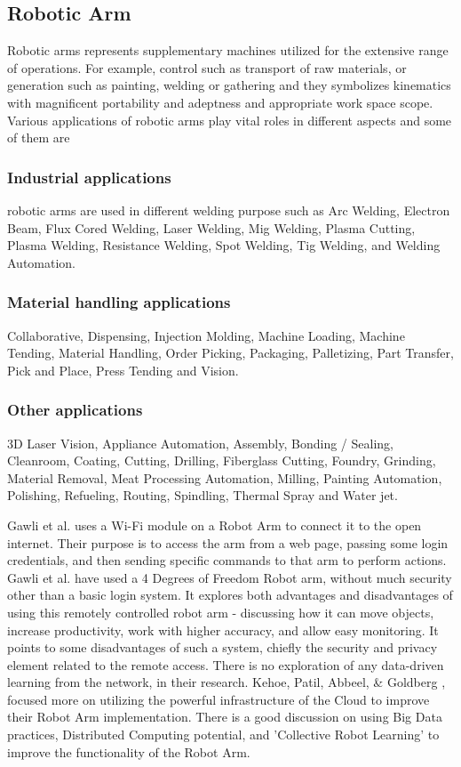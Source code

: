 \documentclass[conference]{IEEEtran}
\begin{document}
\subsection{Robotic Arm}
Robotic arms represents  supplementary machines utilized for the extensive range of operations. For example, control such as transport of raw materials, or  generation such as painting, welding or gathering and they symbolizes kinematics with magnificent portability and adeptness and appropriate work space scope. Various applications of robotic arms \cite{twelve} play vital roles in different aspects and some of them are

\subsubsection{Industrial applications}
robotic arms are used in different welding purpose such as Arc Welding, Electron Beam, Flux Cored Welding, Laser Welding, Mig Welding, Plasma Cutting, Plasma Welding, Resistance Welding, Spot Welding, Tig Welding, and Welding Automation.


\subsubsection{Material handling applications}
Collaborative, Dispensing, Injection Molding, Machine Loading, Machine Tending, Material Handling, Order Picking, Packaging, Palletizing, Part Transfer, Pick and Place, Press Tending and Vision.

\subsubsection{Other applications}
3D Laser Vision, Appliance Automation, Assembly, Bonding / Sealing, Cleanroom, Coating, Cutting, Drilling, Fiberglass Cutting, Foundry, Grinding, Material Removal, Meat Processing Automation, Milling, Painting Automation, Polishing, Refueling, Routing, Spindling, Thermal Spray and Water jet.

Gawli et al. \cite{thirteen} uses a Wi-Fi module on a Robot Arm to connect it to the open internet. Their purpose is to access the arm from a web page, passing some login credentials, and then sending specific commands to that arm to perform actions. Gawli et al. have used a 4 Degrees of Freedom Robot arm, without much security other than a basic login system. It explores both advantages and disadvantages of using this remotely controlled robot arm - discussing how it can move objects, increase productivity, work with higher accuracy, and allow easy monitoring. It points to some disadvantages of such a system, chiefly the security and privacy element related to the remote access. There is no exploration of any data-driven learning from the network, in their research. Kehoe, Patil, Abbeel, \& Goldberg \cite{fourteen}, focused more on utilizing the powerful infrastructure of the Cloud to improve their Robot Arm implementation. There is a good discussion on using Big Data practices, Distributed Computing potential, and 'Collective Robot Learning' to improve the functionality of the Robot Arm.
\end{document}
